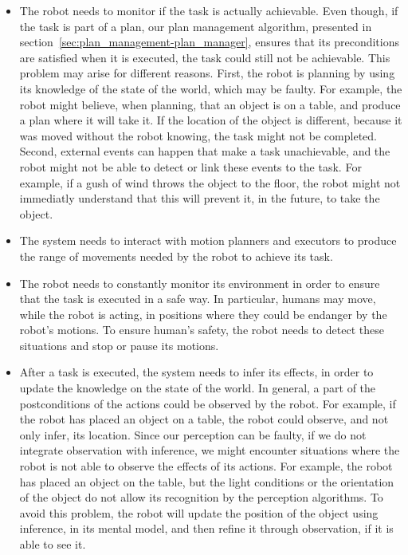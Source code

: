 \begin{itemize}
\item The robot needs to monitor if the task is actually achievable. Even though, if the task is part of a plan, our plan management algorithm, presented in section~\ref{sec:plan_management-plan_manager}, ensures that its preconditions are satisfied when it is executed, the task could still not be achievable. This problem may arise for different reasons. First, the robot is planning by using its knowledge of the state of the world, which may be faulty. For example, the robot might believe, when planning, that an object is on a table, and produce a plan where it will take it. If the location of the object is different, because it was moved without the robot knowing, the task might not be completed. Second, external events can happen that make a task unachievable, and the robot might not be able to detect or link these events to the task. For example, if a gush of wind throws the object to the floor, the robot might not immediatly understand that this will prevent it, in the future, to take the object.
\item The system needs to interact with motion planners and executors to produce the range of movements needed by the robot to achieve its task.
\item The robot needs to constantly monitor its environment in order to ensure that the task is executed in a safe way. In particular, humans may move, while the robot is acting, in positions where they could be endanger by the robot's motions. To ensure human's safety, the robot needs to detect these situations and stop or pause its motions.
\item After a task is executed, the system needs to infer its effects, in order to update the knowledge on the state of the world. In general, a part of the postconditions of the actions could be observed by the robot. For example, if the robot has placed an object on a table, the robot could observe, and not only infer, its location. Since our perception can be faulty, if we do not integrate observation with inference, we might encounter situations where the robot is not able to observe the effects of its actions. For example, the robot has placed an object on the table, but the light conditions or the orientation of the object do not allow its recognition by the perception algorithms. To avoid this problem, the robot will update the position of the object using inference, in its mental model, and then refine it through observation, if it is able to see it.
\end{itemize}

